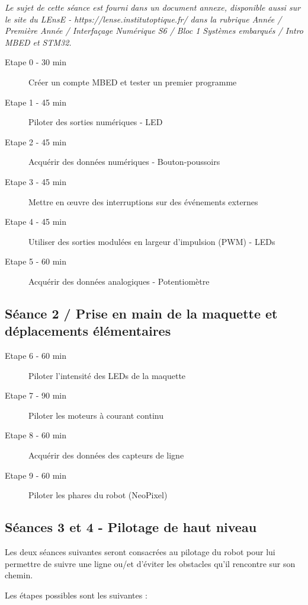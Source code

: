 \documentclass[a4paper,11pt,titlepage]{article} %
\begin{document}
\textit{Le sujet de cette séance est fourni dans un document annexe, disponible aussi sur le site du LEnsE - https://lense.institutoptique.fr/ dans la rubrique Année / Première Année / Interfaçage Numérique S6 / Bloc 1 Systèmes embarqués / Intro MBED et STM32.}

	\begin{description}
		\item[Etape 0 - 30 min] Créer un compte MBED et tester un premier programme
		\item[Etape 1 - 45 min] Piloter des sorties numériques - LED
		\item[Etape 2 - 45 min] Acquérir des données numériques - Bouton-poussoirs
		\item[Etape 3 - 45 min] Mettre en \oe{}uvre des interruptions sur des événements externes
		\item[Etape 4 - 45 min] Utiliser des sorties modulées en largeur d'impulsion (PWM) - LEDs
		\item[Etape 5 - 60 min] Acquérir des données analogiques - Potentiomètre
	\end{description}	


\subsection{Séance 2 / Prise en main de la maquette et déplacements élémentaires}

	\begin{description}
		\item[Etape 6 - 60 min] Piloter l'intensité des LEDs de la maquette
		\item[Etape 7 - 90 min] Piloter les moteurs à courant continu
		\item[Etape 8 - 60 min] Acquérir des données des capteurs de ligne				
		\item[Etape 9 - 60 min] Piloter les phares du robot (NeoPixel)
	\end{description}


\subsection{Séances 3 et 4 - Pilotage de haut niveau}

Les deux séances suivantes seront consacrées au pilotage du robot pour lui permettre de suivre une ligne ou/et d'éviter les obstacles qu'il rencontre sur son chemin.

Les étapes possibles sont les suivantes :
\end{document}
